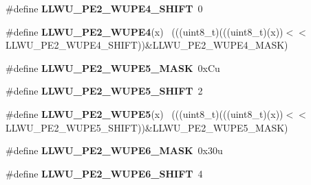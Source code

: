 \begin{DoxyCompactItemize}
\item 
\hypertarget{group___l_l_w_u___register___masks_ga12aa6ffb998e5273a8dd548ac434ad41}{}\#define {\bfseries L\+L\+W\+U\+\_\+\+P\+E2\+\_\+\+W\+U\+P\+E4\+\_\+\+S\+H\+I\+F\+T}~0\label{group___l_l_w_u___register___masks_ga12aa6ffb998e5273a8dd548ac434ad41}

\item 
\hypertarget{group___l_l_w_u___register___masks_ga66bcf97ee2fda285ac3a24ba5cc0b1a1}{}\#define {\bfseries L\+L\+W\+U\+\_\+\+P\+E2\+\_\+\+W\+U\+P\+E4}(x)                                            ~(((uint8\+\_\+t)(((uint8\+\_\+t)(x))$<$$<$L\+L\+W\+U\+\_\+\+P\+E2\+\_\+\+W\+U\+P\+E4\+\_\+\+S\+H\+I\+F\+T))\&L\+L\+W\+U\+\_\+\+P\+E2\+\_\+\+W\+U\+P\+E4\+\_\+\+M\+A\+S\+K)\label{group___l_l_w_u___register___masks_ga66bcf97ee2fda285ac3a24ba5cc0b1a1}

\item 
\hypertarget{group___l_l_w_u___register___masks_gacfb855231e7a1c11c64d8b4e951817be}{}\#define {\bfseries L\+L\+W\+U\+\_\+\+P\+E2\+\_\+\+W\+U\+P\+E5\+\_\+\+M\+A\+S\+K}~0x\+Cu\label{group___l_l_w_u___register___masks_gacfb855231e7a1c11c64d8b4e951817be}

\item 
\hypertarget{group___l_l_w_u___register___masks_ga4e823ada9bfc21dca4729eedf4e63778}{}\#define {\bfseries L\+L\+W\+U\+\_\+\+P\+E2\+\_\+\+W\+U\+P\+E5\+\_\+\+S\+H\+I\+F\+T}~2\label{group___l_l_w_u___register___masks_ga4e823ada9bfc21dca4729eedf4e63778}

\item 
\hypertarget{group___l_l_w_u___register___masks_gac3a8a230033b46633beb6b1ddb282bfd}{}\#define {\bfseries L\+L\+W\+U\+\_\+\+P\+E2\+\_\+\+W\+U\+P\+E5}(x)                                            ~(((uint8\+\_\+t)(((uint8\+\_\+t)(x))$<$$<$L\+L\+W\+U\+\_\+\+P\+E2\+\_\+\+W\+U\+P\+E5\+\_\+\+S\+H\+I\+F\+T))\&L\+L\+W\+U\+\_\+\+P\+E2\+\_\+\+W\+U\+P\+E5\+\_\+\+M\+A\+S\+K)\label{group___l_l_w_u___register___masks_gac3a8a230033b46633beb6b1ddb282bfd}

\item 
\hypertarget{group___l_l_w_u___register___masks_ga0db50e96153e1ca74874da97d1c22f41}{}\#define {\bfseries L\+L\+W\+U\+\_\+\+P\+E2\+\_\+\+W\+U\+P\+E6\+\_\+\+M\+A\+S\+K}~0x30u\label{group___l_l_w_u___register___masks_ga0db50e96153e1ca74874da97d1c22f41}

\item 
\hypertarget{group___l_l_w_u___register___masks_gaa7a0191eaf60166333a8bee953239c85}{}\#define {\bfseries L\+L\+W\+U\+\_\+\+P\+E2\+\_\+\+W\+U\+P\+E6\+\_\+\+S\+H\+I\+F\+T}~4\label{group___l_l_w_u___register___masks_gaa7a0191eaf60166333a8bee953239c85}


\end{DoxyCompactItemize}
